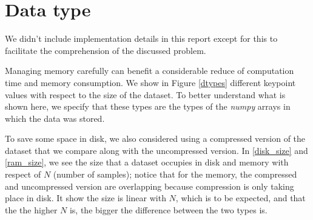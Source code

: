 \documentclass[12pt, a4paper]{report}
\begin{document}
	\chapter{Data type}\label{appendix_d}
		We didn't include implementation details in this report except for this to facilitate the comprehension of the discussed problem.
		\par
		Managing memory carefully can benefit a considerable reduce of computation time and memory consumption.
		We show in Figure \ref{dtypes} different keypoint values with respect to the size of the dataset.
		To better understand what is shown here, we specify that these types are the types of the {\itshape numpy} arrays in which the data was stored.
		\par
		To save some space in disk, we also considered using a compressed version of the dataset that we compare along with the uncompressed version.
		In \ref{disk_size} and \ref{ram_size}, we see the size that a dataset occupies in disk and memory with respect of $N$ (number of samples); notice that for the memory, the compressed and uncompressed version are overlapping because compression is only taking place in disk.
		It show the size is linear with $N$, which is to be expected, and that the the higher $N$ is, the bigger the difference between the two types is.
\end{document}
